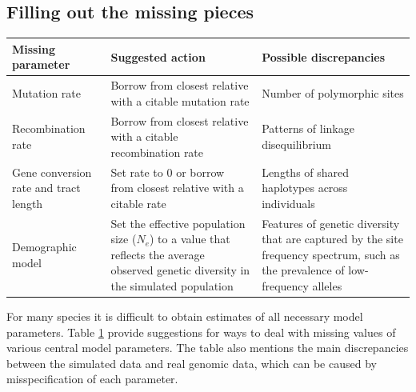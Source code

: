 \documentclass[hidelinks]{article}
\begin{document}
\subsection*{Filling out the missing pieces}

\begin{table}[b!]
	 \label{tab:param-mod}
	\begin{tabular}{p{1.5in}p{2.2in}p{2.2in}}
		\hline
		\textbf{Missing parameter}  & 
		\textbf{Suggested action} & 
		\textbf{Possible discrepancies} \\
		\hline
		Mutation rate      &
		Borrow from closest relative with a citable mutation rate &
		Number of polymorphic sites  \\
		\hline
		Recombination rate &
		Borrow from closest relative with a citable recombination rate &
		Patterns of linkage disequilibrium
		\\
		\hline
		Gene conversion rate and tract length &
		Set rate to 0 or borrow from closest relative with a citable rate &
		Lengths of shared haplotypes across individuals
		\\
		\hline
		Demographic model &
		Set the effective population size ($N_e$) to a value
		that reflects the average observed genetic diversity in the
		simulated population
		     &
		Features of genetic diversity that are captured by the site frequency spectrum,
		such as the prevalence of low-frequency alleles\\
		\hline
	\end{tabular}
\end{table}

For many species it is difficult to obtain estimates of all necessary model parameters.
Table \ref{tab:param-mod} provide suggestions for ways to deal with missing values of various central model parameters.
The table also mentions the main discrepancies between the simulated data and real genomic data,
which can be caused by misspecification of each parameter.
\end{document}
